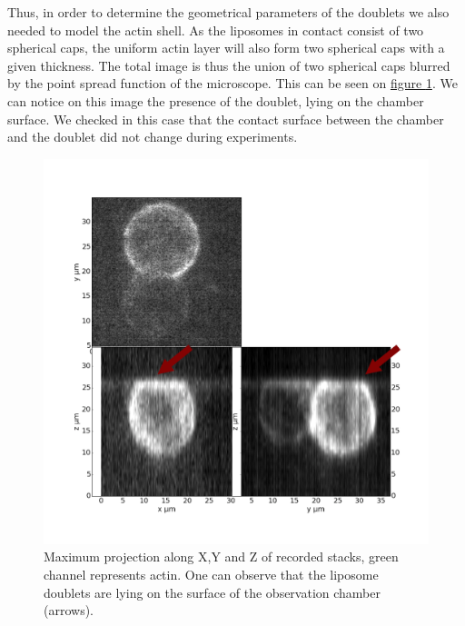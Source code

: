 \documentclass[A4paperpaper,11pt,english]{sphinxmanual}
\begin{document}
Thus, in order to determine the geometrical parameters of the doublets we also needed
to model the actin shell. As the liposomes in contact consist of two spherical
caps, the uniform actin layer will also form two spherical caps with a given
thickness. The total image is thus the union of two spherical caps blurred by
the point spread function of the microscope. This can be seen on \hyperref[index-latex:mproj1]{figure  \ref*{index-latex:mproj1}}.  We can notice on this image the presence of the doublet, lying on the
chamber surface. We checked in this case that the contact surface between the
chamber and the doublet did not change during experiments.
\begin{figure}[htbp]
\centering
\capstart

\includegraphics[width=0.800\linewidth]{max_proj_340A.png}
\caption{Maximum projection along X,Y and Z of recorded stacks, green channel represents actin.
One can observe that the liposome doublets are lying on the surface of the
observation chamber (arrows).}\label{index-latex:mproj1}\end{figure}
\end{document}
